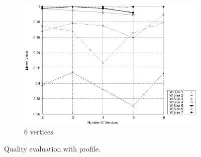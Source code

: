 \begin{figure}[h]
\begin{subfigure}{0.33\textwidth}
    \includegraphics[width=\textwidth]{Images/graphs/window_quality_performance_diff_qual_n7_s7_20_100_n7}
    \caption{6 vertices}
    \label{fig:quality_window_wide_qualitative_n7}
  \end{subfigure}

  \caption{ Quality evaluation with \wide profile.}
  \label{fig:quality_window_wide_qualitative}
\end{figure}

